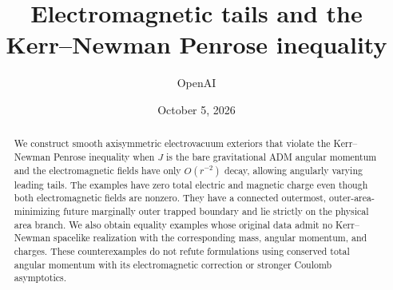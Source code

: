 \documentclass[11pt]{article}
\title{Electromagnetic tails and the\texorpdfstring{\\}{}Kerr--Newman Penrose inequality}
\author{OpenAI}
\date{October 5, 2026}
\begin{document}
\maketitle
\begin{abstract}
We construct smooth axisymmetric electrovacuum exteriors that violate the
Kerr--Newman Penrose inequality when \(J\) is the bare gravitational ADM
angular momentum and the electromagnetic fields have only \(O(r^{-2})\)
decay, allowing angularly varying leading tails. The examples have zero
total electric and magnetic charge even though both electromagnetic fields
are nonzero. They have a connected outermost, outer-area-minimizing future
marginally outer trapped boundary and lie strictly on the physical area
branch. We also obtain equality examples whose original data admit no
Kerr--Newman spacelike realization with the corresponding mass, angular
momentum, and charges. These counterexamples do not refute formulations
using conserved total angular momentum with its electromagnetic correction
or stronger Coulomb asymptotics.
\end{abstract}





\clearpage


\end{document}
